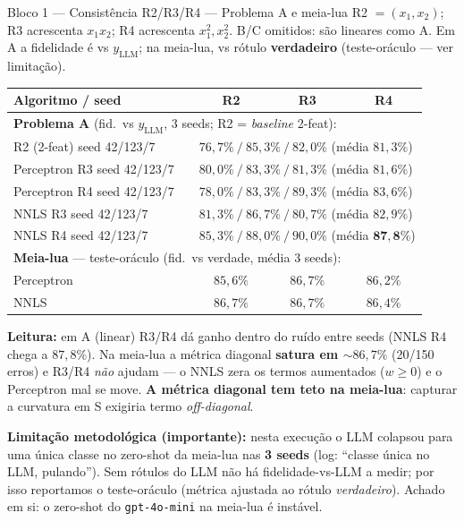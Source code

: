 \documentclass[aspectratio=169,10pt]{beamer}
\begin{document}
\begin{frame}{Bloco 1 --- Consist\^encia R2/R3/R4 --- Problema A e meia-lua}
  \scriptsize
  R2 $= (x_1,x_2)$; R3 acrescenta $x_1 x_2$; R4 acrescenta $x_1^2, x_2^2$. B/C omitidos: s\~ao lineares como A. Em A a fidelidade \'e vs $y_{\text{LLM}}$; na meia-lua, vs r\'otulo \textbf{verdadeiro} (teste-or\'aculo --- ver limita\c{c}\~ao).
  \begin{center}
  \begin{tabular}{llccc}
    \toprule
    Algoritmo / seed & & R2 & R3 & R4 \\
    \midrule
    \multicolumn{5}{l}{\textbf{Problema A} (fid.\ vs $y_{\text{LLM}}$, 3 seeds; R2 = \emph{baseline} 2-feat):} \\
    R2 (2-feat) seed 42/123/7 & & \multicolumn{3}{l}{$76{,}7\%\ /\ 85{,}3\%\ /\ 82{,}0\%$ \quad (m\'edia $81{,}3\%$)} \\
    Perceptron R3 seed 42/123/7 & & \multicolumn{3}{l}{$80{,}0\%\ /\ 83{,}3\%\ /\ 81{,}3\%$ \quad (m\'edia $81{,}6\%$)} \\
    Perceptron R4 seed 42/123/7 & & \multicolumn{3}{l}{$78{,}0\%\ /\ 83{,}3\%\ /\ 89{,}3\%$ \quad (m\'edia $83{,}6\%$)} \\
    NNLS R3 seed 42/123/7 & & \multicolumn{3}{l}{$81{,}3\%\ /\ 86{,}7\%\ /\ 80{,}7\%$ \quad (m\'edia $82{,}9\%$)} \\
    NNLS R4 seed 42/123/7 & & \multicolumn{3}{l}{$85{,}3\%\ /\ 88{,}0\%\ /\ 90{,}0\%$ \quad (m\'edia $\mathbf{87{,}8\%}$)} \\
    \midrule
    \multicolumn{5}{l}{\textbf{Meia-lua} --- teste-or\'aculo (fid.\ vs verdade, m\'edia 3 seeds):} \\
    Perceptron & & $85{,}6\%$ & $86{,}7\%$ & $86{,}2\%$ \\
    NNLS       & & $86{,}7\%$ & $86{,}7\%$ & $86{,}4\%$ \\
    \bottomrule
  \end{tabular}
  \end{center}
  \tiny
  \textbf{Leitura:} em A (linear) R3/R4 d\'a ganho dentro do ru\'ido entre seeds (NNLS R4 chega a $87{,}8\%$). Na meia-lua a m\'etrica diagonal \textbf{satura em $\sim 86{,}7\%$} (20/150 erros) e R3/R4 \emph{n\~ao} ajudam --- o NNLS zera os termos aumentados ($w\geq0$) e o Perceptron mal se move. \textbf{A m\'etrica diagonal tem teto na meia-lua}: capturar a curvatura em S exigiria termo \emph{off-diagonal}.

  \textbf{Limita\c{c}\~ao metodol\'ogica (importante):} nesta execu\c{c}\~ao o LLM colapsou para uma \'unica classe no zero-shot da meia-lua nas \textbf{3 seeds} (log: ``classe \'unica no LLM, pulando''). Sem r\'otulos do LLM n\~ao h\'a fidelidade-vs-LLM a medir; por isso reportamos o teste-or\'aculo (m\'etrica ajustada ao r\'otulo \emph{verdadeiro}). Achado em si: o zero-shot do \texttt{gpt-4o-mini} na meia-lua \'e inst\'avel.
\end{frame}
\end{document}
